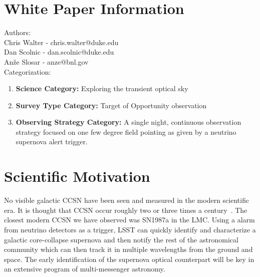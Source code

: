 \documentclass[11pt, letterpaper]{article}
\begin{document}
\newpage

\section{White Paper Information}

\noindent
Authors: \\

\noindent
Chris Walter - chris.walter@duke.edu \\
Dan Scolnic - dan.scolnic@duke.edu \\
An\v{z}e Slosar - anze@bnl.gov \\

\noindent
Categorization: 
\begin{enumerate} 
\item {\bf Science Category:}  Exploring the transient optical sky
\item {\bf Survey Type Category:}  Target of Opportunity observation
\item {\bf Observing Strategy Category:}  A single night, continuous
  observation strategy focused on one few degree field pointing as given by
  a neutrino supernova alert trigger.
\end{enumerate}  

\clearpage

\section{Scientific Motivation}
\label{sec:motivation}

No visible galactic CCSN have been seen and measured in the modern
scientific era. It is thought that CCSN occur roughly two or three
times a century~\cite{1994ApJS...92..487T, 2001ASSL..264..199C}.  The
closest modern CCSN we have observed was SN1987a in the LMC.  Using a
alarm from neutrino detectors as a trigger, LSST can quickly identify
and characterize a galactic core-collapse supernova and then notify
the rest of the astronomical community which can then track it in
multiple wavelengths from the ground and space.  The early
identification of the supernova optical counterpart will be key in an
extensive program of multi-messenger astronomy.
\end{document}
